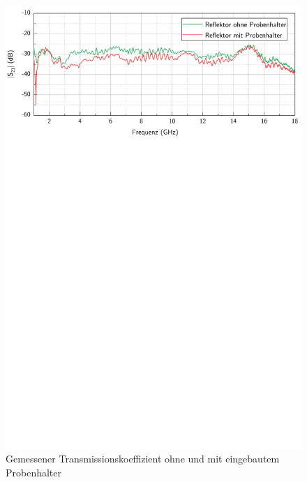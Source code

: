 \begin{figure}[ht]
    \centering
    \includegraphics[page=1, width = .99\textwidth, trim = 0cm 17.3cm 0cm 0cm, clip]{Abbildungen/Kapitel4/Messergebnisse/Vergleich mit und ohne Probenhalter (geerdet).pdf}
    \caption{Gemessener Transmissionskoeffizient ohne und mit eingebautem Probenhalter}
    \label{fig:4_Vergleich_Probenhalter}
\end{figure}


